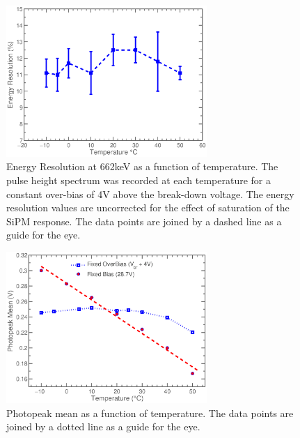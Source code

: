 \documentclass[journal]{IEEEtran}
\begin{document}
\begin{figure}[tb]
\centering
\includegraphics[width=3in]{temp_er.eps}
\caption{Energy Resolution at 662keV as a function of temperature. The pulse height spectrum was recorded at each temperature for a constant over-bias of 4V above the break-down voltage. The energy resolution values are uncorrected for the effect of saturation of the SiPM response. The data points are joined by a dashed line as a guide for the eye.}
\label{fig:ertemp}
\end{figure}

\begin{figure}[tb]
\centering
\includegraphics[width=3in]{temp_depend_all.eps}
\caption{Photopeak mean as a function of temperature. The data points are joined by a dotted line as a guide for the eye.}
\label{fig:photopeak_temp}
\end{figure}


\end{document}

